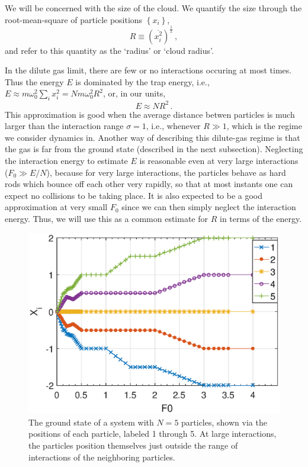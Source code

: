 \documentclass[onecolumn,pra]{revtex4-1}
\begin{document}
We will be concerned with the size of the cloud.  We quantify the size through the root-mean-square
of particle positions $\left\lbrace x_i\right\rbrace$, 
\begin{equation}
R\equiv\left(\overline{x_i^2}\right)^\frac{1}{2} \, ,
\label{eq:def_of_R}
\end{equation}
and refer to this quantity as the `radius' or `cloud radius'.

In the dilute gas limit, there are few or no interactions occuring at most times.  Thus the energy
$E$ is dominated by the trap energy, i.e., $E\approx m\omega_0^2\sum_{i}x_i^2= Nm\omega_0^2R^2$, or,
in our units,
\begin{equation}
  E\approx NR^2 \, .
  \label{eq:E_and_R}
\end{equation}
%
This approximation is good when the average distance betwen particles is much larger than the
interaction range $\sigma=1$, i.e., whenever $R\gg1$, which is the regime we consider dynamics in.
Another way of describing this dilute-gas regime is that the gas is far from the ground state
(described in the next subsection).  Neglecting the interaction energy to estimate $E$ is reasonable
even at very large interactions ($F_0\gg E/N$), because for very large interactions, the particles
behave as hard rods which bounce off each other very rapidly, so that at most instants one can
expect no collisions to be taking place.  It is also expected to be a good approximation at very
small $F_0$ since we can then simply neglect the interaction energy.  Thus, we will use this as a
common estimate for $R$ in terms of the energy.  


\begin{figure}[tbhp]
\centering
\includegraphics[scale=0.6]{ZhiyuPictures/N=5_GS_pre_2_rev.eps}
\caption{The ground state of a system with $N=5$ particles, shown via the positions of each
  particle, labeled 1 through 5.  At large interactions, the particles position themselves just
  outside the range of interactions of the neighboring particles.}
\label{fig:GS1}
\end{figure}
\end{document}
